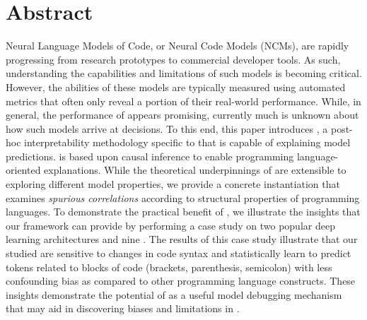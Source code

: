 \cleardoublepage
\chapter{Abstract} %
\label{ch:abstract}

Neural Language Models of Code, or Neural Code Models (NCMs),  are rapidly progressing from research prototypes to commercial developer tools. 
As such, understanding the capabilities and limitations of such models is becoming critical. However, the abilities of these models are typically measured using automated metrics that often only reveal a portion of their real-world performance. While, in general, the performance of \nlms appears promising, currently much is unknown about how such models arrive at decisions. To this end, this paper introduces \codegen, a post-hoc interpretability methodology specific to \nlms that is capable of explaining model predictions. \codegen is based upon causal inference to enable programming language-oriented explanations. While the theoretical underpinnings of \codegen are extensible to exploring different model properties, we provide a concrete instantiation that examines \textit{spurious correlations} according to structural properties of programming languages. To demonstrate the practical benefit of \codegen, we illustrate the insights that our framework can provide by performing a case study on two popular deep learning architectures and nine \nlms. The results of this case study illustrate that our studied \nlms are sensitive to changes in code syntax and statistically learn to predict tokens related to blocks of code (\eg brackets, parenthesis, semicolon) with less confounding bias as compared to other programming language constructs. These insights demonstrate the potential of \codegen as a useful model debugging mechanism that may aid in discovering biases and limitations in \nlms.